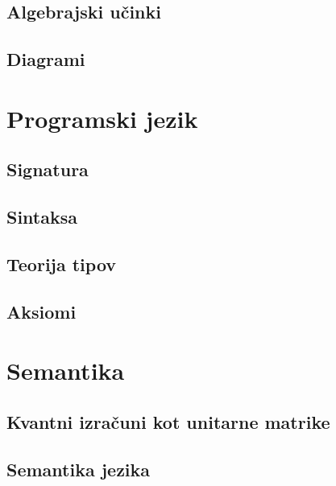 \documentclass[mat1]{fmfdelo}
\begin{document}
\subsection{Algebrajski učinki}  %
\subsection{Diagrami}

\section{Programski jezik}
\subsection{Signatura}
\subsection{Sintaksa}
\subsection{Teorija tipov}  %
\subsection{Aksiomi}

\section{Semantika}
\subsection{Kvantni izračuni kot unitarne matrike}  %
\subsection{Semantika jezika}  %
\end{document}
